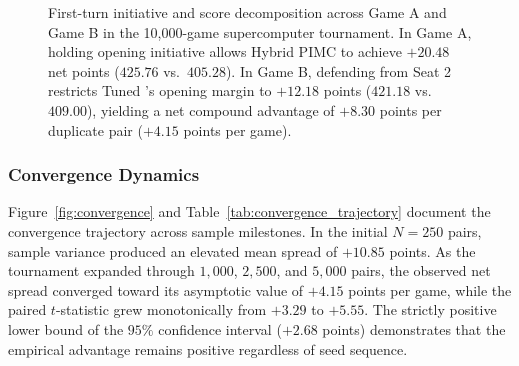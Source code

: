 \begin{figure}[!htbp]
\centering
{}
\caption{First-turn initiative and score decomposition across Game A and Game B in the 10,000-game supercomputer tournament. In Game A, holding opening initiative allows Hybrid PIMC to achieve $+20.48$ net points ($425.76$ vs.\ $405.28$). In Game B, defending from Seat 2 restricts Tuned \magpie's opening margin to $+12.18$ points ($421.18$ vs.\ $409.00$), yielding a net compound advantage of $+8.30$ points per duplicate pair ($+4.15$ points per game).}
\label{fig:initiative_breakdown}
\end{figure}

\subsubsection{Convergence Dynamics}

Figure~\ref{fig:convergence} and Table~\ref{tab:convergence_trajectory} document the convergence trajectory across sample milestones. In the initial $N = 250$ pairs, sample variance produced an elevated mean spread of $+10.85$ points. As the tournament expanded through $1,000$, $2,500$, and $5,000$ pairs, the observed net spread converged toward its asymptotic value of $+4.15$ points per game, while the paired $t$-statistic grew monotonically from $+3.29$ to $+5.55$. The strictly positive lower bound of the $95\%$ confidence interval ($+2.68$ points) demonstrates that the empirical advantage remains positive regardless of seed sequence.

